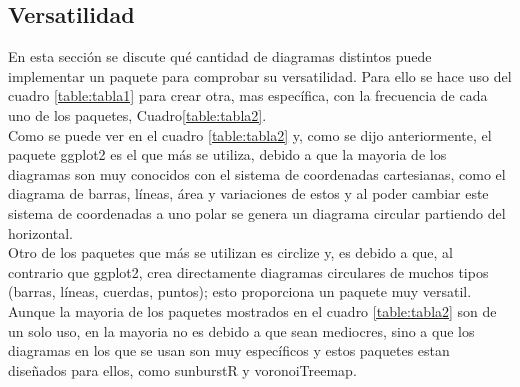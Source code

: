 \documentclass{article}\usepackage[]{graphicx}\usepackage[]{color}
\begin{document}
\subsection{Versatilidad}
En esta secci\'on se discute qu\'e cantidad de diagramas distintos puede implementar un paquete para comprobar su versatilidad. Para ello se hace uso del cuadro \ref{table:tabla1} para crear otra, mas espec\'ifica, con la frecuencia de cada uno de los paquetes, Cuadro\ref{table:tabla2}.~\\
Como se puede ver en el cuadro \ref{table:tabla2} y, como se dijo anteriormente, el paquete ggplot2 es el que m\'as se utiliza, debido a que la mayoria de los diagramas son muy conocidos con el sistema de coordenadas cartesianas, como el diagrama de barras, l\'ineas, \'area y variaciones de estos y al poder cambiar este sistema de coordenadas a uno polar se genera un diagrama circular partiendo del horizontal.~\\
Otro de los paquetes que m\'as se utilizan es circlize y, es debido a que, al contrario que ggplot2, crea directamente diagramas circulares de muchos tipos (barras, l\'ineas, cuerdas, puntos); esto proporciona un paquete muy versatil.~\\
Aunque la mayoria de los paquetes mostrados en el cuadro \ref{table:tabla2} son de un solo uso, en la mayoria no es debido a que sean mediocres, sino a que los diagramas en los que se usan son muy espec\'ificos y estos paquetes estan dise\~nados para ellos, como sunburstR y voronoiTreemap.~\\
\end{document}
